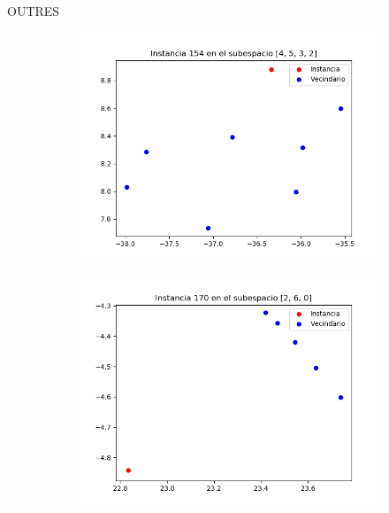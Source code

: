 \documentclass[10pt]{beamer}
\begin{document}
\begin{frame}[fragile]{OUTRES}
\vspace{10px}

\begin{figure}
	\centering
	\begin{subfigure}{0.49\textwidth}
		\centering
		\includegraphics[scale=0.36]{Imagenes/173-tsne}
	\end{subfigure}
	\pause
	\begin{subfigure}{0.49\textwidth}
		\centering
		\includegraphics[scale=0.36]{Imagenes/190-tsne}
	\end{subfigure}
\end{figure}

\end{frame}
\end{document}
